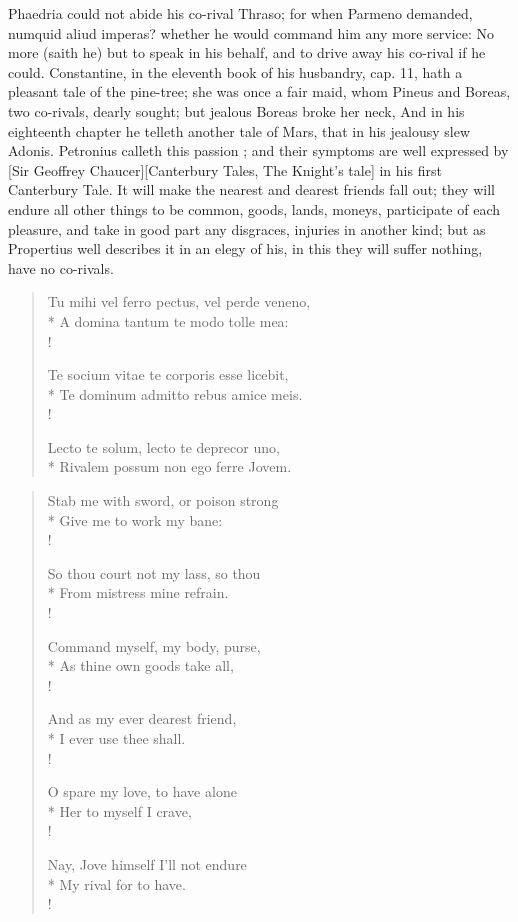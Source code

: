Phaedria could not abide his co-rival Thraso; for when Parmeno
demanded, numquid aliud imperas? whether he would command him any more
service: No more (saith he) but to speak in his behalf, and to drive
away his co-rival if he could. Constantine, in the eleventh book of his
husbandry, cap. 11, hath a pleasant tale of the pine-tree; she
was once a fair maid, whom Pineus and Boreas, two co-rivals, dearly
sought; but jealous Boreas broke her neck, \etc{} And in his eighteenth
chapter he telleth another tale of Mars, that in his jealousy
slew Adonis. Petronius calleth this passion ; and their symptoms are well expressed by [Sir Geoffrey Chaucer][Canterbury Tales, The Knight's tale] in his first Canterbury Tale. It will
make the nearest and dearest friends fall out; they will endure all
other things to be common, goods, lands, moneys, participate of each
pleasure, and take in good part any disgraces, injuries in another
kind; but as Propertius well describes it in an elegy of his, in this
they will suffer nothing, have no co-rivals.
%
\begin{latin}
\begin{verse}%
Tu mihi vel ferro pectus, vel perde veneno,\\*
A domina tantum te modo tolle mea:\\!

Te socium vitae te corporis esse licebit,\\*
Te dominum admitto rebus amice meis.\\!

Lecto te solum, lecto te deprecor uno,\\*
Rivalem possum non ego ferre Jovem.
\end{verse}%
\end{latin}
\translationrule%
\begin{verse}%
Stab me with sword, or poison strong\\*
Give me to work my bane:\\!

So thou court not my lass, so thou\\*
From mistress mine refrain.\\!

Command myself, my body, purse,\\*
As thine own goods take all,\\!

And as my ever dearest friend,\\*
I ever use thee shall.\\!

O spare my love, to have alone\\*
Her to myself I crave,\\!

Nay, Jove himself I'll not endure\\*
My rival for to have.\\!
\end{verse}%
%


